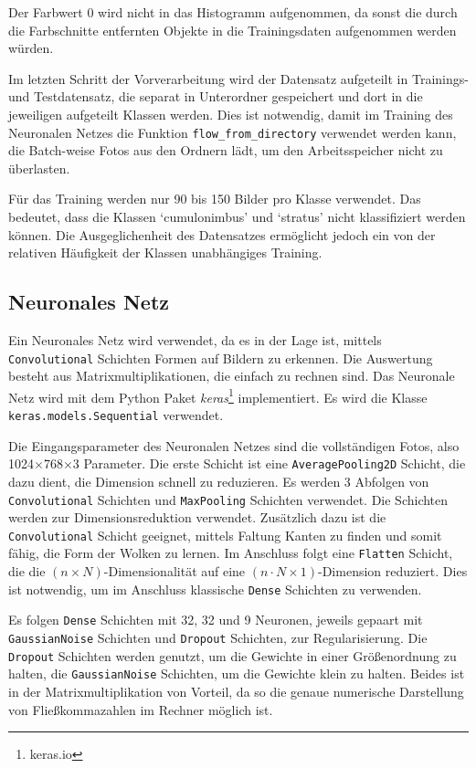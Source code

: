 Der Farbwert $0$ wird nicht in das Histogramm aufgenommen, da sonst
die durch die Farbschnitte entfernten Objekte in die Trainingsdaten
aufgenommen werden würden.

Im letzten Schritt der Vorverarbeitung wird der Datensatz aufgeteilt in
Trainings- und Testdatensatz, die separat in Unterordner gespeichert und
dort in die jeweiligen aufgeteilt Klassen werden. Dies ist notwendig,
damit im Training des Neuronalen Netzes die Funktion
\texttt{flow\_from\_directory} verwendet werden kann, die Batch-weise
Fotos aus den Ordnern lädt, um den Arbeitsspeicher nicht zu überlasten.

Für das Training werden nur 90 bis 150 Bilder pro Klasse verwendet.
Das bedeutet, dass die Klassen `cumulonimbus' und `stratus' nicht klassifiziert werden können.
Die Ausgeglichenheit des Datensatzes ermöglicht jedoch ein von der relativen Häufigkeit der
Klassen unabhängiges Training.

\hypertarget{neuronales-netz}{%
\subsection{Neuronales Netz}\label{neuronales-netz}}

Ein Neuronales Netz wird verwendet, da es in der Lage ist, mittels
\texttt{Convolutional} Schichten Formen auf Bildern zu erkennen. Die
Auswertung besteht aus Matrixmultiplikationen, die einfach zu rechnen sind.
Das Neuronale Netz wird mit dem Python Paket \emph{keras}\footnote{keras.io}
implementiert. Es wird die Klasse \texttt{keras.models.Sequential}
verwendet.

Die Eingangsparameter des Neuronalen Netzes sind die vollständigen
Fotos, also 1024$\times$768$\times$3 Parameter. Die erste Schicht ist eine
\texttt{AveragePooling2D} Schicht, die dazu dient, die Dimension schnell
zu reduzieren. Es werden 3 Abfolgen von \texttt{Convolutional} Schichten
und \texttt{MaxPooling} Schichten verwendet. Die Schichten werden zur
Dimensionsreduktion verwendet. Zusätzlich dazu ist die
\texttt{Convolutional} Schicht geeignet, mittels Faltung Kanten zu
finden und somit fähig, die Form der Wolken zu lernen. Im Anschluss
folgt eine \texttt{Flatten} Schicht, die die
$(n \times N)$-Dimensionalität auf eine
$(n \cdot N \times 1)$-Dimension reduziert. Dies ist notwendig, um im
Anschluss klassische \texttt{Dense} Schichten zu verwenden.

Es folgen \texttt{Dense} Schichten mit 32, 32 und 9 Neuronen, jeweils
gepaart mit \texttt{GaussianNoise} Schichten und \texttt{Dropout}
Schichten, zur Regularisierung. Die \texttt{Dropout} Schichten werden
genutzt, um die Gewichte in einer Größenordnung zu halten, die
\texttt{GaussianNoise} Schichten, um die Gewichte klein zu halten.
Beides ist in der Matrixmultiplikation von Vorteil, da so die genaue
numerische Darstellung von Fließkommazahlen im Rechner möglich ist.

